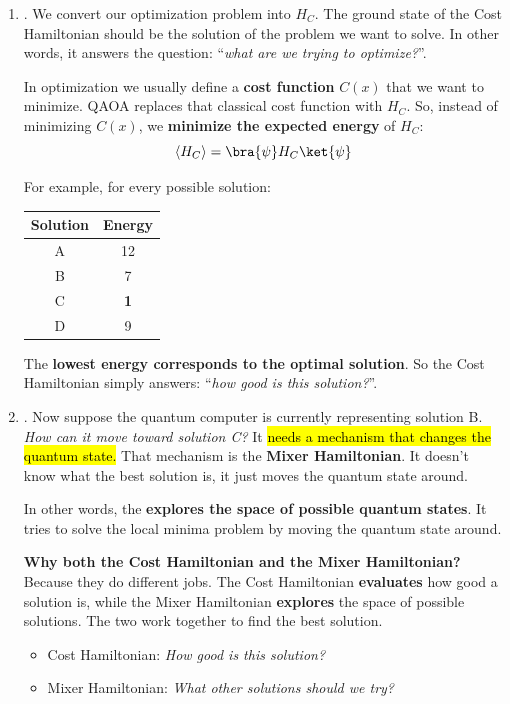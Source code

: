 \begin{enumerate}
    \item {}. We convert our optimization problem into $H_C$. The ground state of the Cost Hamiltonian should be the solution of the problem we want to solve. In other words, it answers the question: ``\emph{what are we trying to optimize?}''.
    
    In optimization we usually define a \textbf{cost function} $C(x)$ that we want to minimize. QAOA replaces that classical cost function with $H_C$. So, instead of minimizing $C(x)$, we \textbf{minimize the expected energy} of $H_C$:
    \begin{equation*}
        \langle H_C \rangle = \bra{\psi} H_C \ket{\psi}
    \end{equation*}

    For example, for every possible solution:
    \begin{center}
        \begin{tabular}{@{} c c @{}}
            \toprule
            \textbf{Solution} & \textbf{Energy} \\
            \midrule
            A & 12 \\
            B & 7 \\
            C & \textbf{1} \\
            D & 9 \\
            \bottomrule
        \end{tabular}
    \end{center}
    The \textbf{lowest energy corresponds to the optimal solution}. So the Cost Hamiltonian simply answers: ``\emph{how good is this solution?}''.


    \item {}. Now suppose the quantum computer is currently representing solution B. \emph{How can it move toward solution C?} It \hl{needs a mechanism that changes the quantum state.} That mechanism is the \textbf{Mixer Hamiltonian}. It doesn't know what the best solution is, it just moves the quantum state around.
    
    In other words, the  \textbf{explores the space of possible quantum states}. It tries to solve the local minima problem by moving the quantum state around.

    \textcolor{Green3}{ \textbf{Why both the Cost Hamiltonian and the Mixer Hamiltonian?}} Because they do different jobs. The Cost Hamiltonian \textbf{evaluates} how good a solution is, while the Mixer Hamiltonian \textbf{explores} the space of possible solutions. The two work together to find the best solution.
    \begin{itemize}
        \item Cost Hamiltonian: \emph{How good is this solution?}
        \item Mixer Hamiltonian: \emph{What other solutions should we try?}
    \end{itemize}


\end{enumerate}
